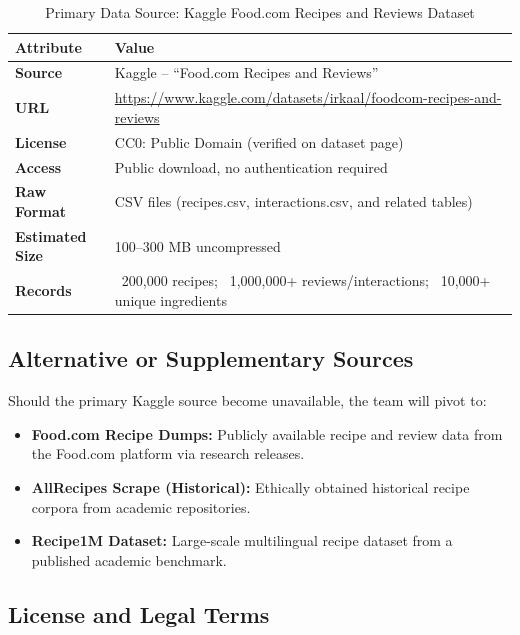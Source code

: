 \documentclass[11pt,a4paper]{article}
\begin{document}
\begin{table}[H]
    \centering
    \begin{tabular}{|p{3cm}|p{10cm}|}
        \hline
        \textbf{Attribute} & \textbf{Value} \\
        \hline
        \textbf{Source} & Kaggle -- ``Food.com Recipes and Reviews'' \\
        \hline
        \textbf{URL} & \url{https://www.kaggle.com/datasets/irkaal/foodcom-recipes-and-reviews} \\
        \hline
        \textbf{License} & CC0: Public Domain (verified on dataset page) \\
        \hline
        \textbf{Access} & Public download, no authentication required \\
        \hline
        \textbf{Raw Format} & CSV files (recipes.csv, interactions.csv, and related tables) \\
        \hline
        \textbf{Estimated Size} & 100--300 MB uncompressed \\
        \hline
        \textbf{Records} & ~200,000 recipes; ~1,000,000+ reviews/interactions; ~10,000+ unique ingredients \\
        \hline
    \end{tabular}
    \caption{Primary Data Source: Kaggle Food.com Recipes and Reviews Dataset}
    \label{tab:primary_source}
\end{table}

\subsection{Alternative or Supplementary Sources}

Should the primary Kaggle source become unavailable, the team will pivot to:

\begin{itemize}
    \item \textbf{Food.com Recipe Dumps:} Publicly available recipe and review data from the Food.com platform via research releases.
    \item \textbf{AllRecipes Scrape (Historical):} Ethically obtained historical recipe corpora from academic repositories.
    \item \textbf{Recipe1M Dataset:} Large-scale multilingual recipe dataset from a published academic benchmark.
\end{itemize}

\subsection{License and Legal Terms}
\end{document}
